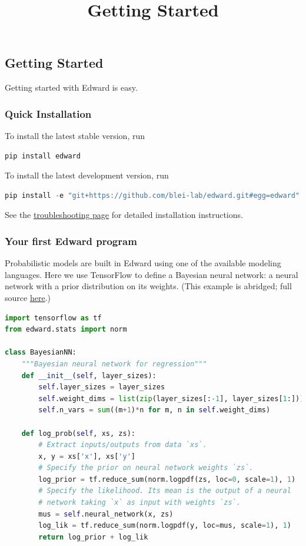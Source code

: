 \title{Getting Started}

\subsection{Getting Started}
Getting started with Edward is easy.

\subsubsection{Quick Installation}
To install the latest stable version, run

\begin{lstlisting}[language=Java]
pip install edward
\end{lstlisting}

To install the latest development version, run

\begin{lstlisting}[language=Java]
pip install -e "git+https://github.com/blei-lab/edward.git#egg=edward"
\end{lstlisting}

See the \href{troubleshooting.html}{troubleshooting page} for detailed
installation instructions.


\subsubsection{Your first Edward program}

Probabilistic models are built in Edward using one of the available
modeling languages. Here we use TensorFlow to define a Bayesian neural
network: a neural network with a prior distribution on its weights.
(This example is abridged; full source
\href{https://github.com/blei-lab/edward/blob/master/examples/getting_started_example.py}
{here}.)
\begin{lstlisting}[language=Python]
import tensorflow as tf
from edward.stats import norm

class BayesianNN:
    """Bayesian neural network for regression"""
    def __init__(self, layer_sizes):
        self.layer_sizes = layer_sizes
        self.weight_dims = list(zip(layer_sizes[:-1], layer_sizes[1:]))
        self.n_vars = sum((m+1)*n for m, n in self.weight_dims)

    def log_prob(self, xs, zs):
        # Extract inputs/outputs from data `xs`.
        x, y = xs['x'], xs['y']
        # Specify the prior on neural network weights `zs`.
        log_prior = tf.reduce_sum(norm.logpdf(zs, loc=0, scale=1), 1)
        # Specify the likelihood. Its mean is the output of a neural
        # network taking `x` as input with weights `zs`.
        mus = self.neural_network(x, zs)
        log_lik = tf.reduce_sum(norm.logpdf(y, loc=mus, scale=1), 1)
        return log_prior + log_lik
\end{lstlisting}

